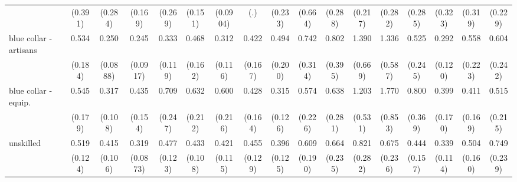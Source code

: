 {\begin{tabular}{l*{16}{c}}
                    &     (0.391)         &     (0.284)         &     (0.169)         &     (0.269)         &     (0.151)         &    (0.0904)         &         (.)         &     (0.233)         &     (0.664)         &     (0.288)         &     (0.217)         &     (0.282)         &     (0.285)         &     (0.323)         &     (0.319)         &     (0.229)         \\
[1em]
blue collar - artisans&       0.534         &       0.250\sym{***}&       0.245\sym{***}&       0.333\sym{**} &       0.468\sym{*}  &       0.312\sym{**} &       0.422\sym{*}  &       0.494         &       0.742         &       0.802         &       1.390         &       1.336         &       0.525         &       0.292\sym{**} &       0.558         &       0.604         \\
                    &     (0.184)         &    (0.0888)         &    (0.0917)         &     (0.119)         &     (0.162)         &     (0.116)         &     (0.167)         &     (0.200)         &     (0.314)         &     (0.395)         &     (0.669)         &     (0.587)         &     (0.245)         &     (0.120)         &     (0.223)         &     (0.242)         \\
[1em]
blue collar - equip.&       0.545         &       0.317\sym{***}&       0.435\sym{*}  &       0.709         &       0.632         &       0.600         &       0.428\sym{*}  &       0.315\sym{**} &       0.574         &       0.638         &       1.203         &       1.770         &       0.800         &       0.399\sym{*}  &       0.411\sym{*}  &       0.515         \\
                    &     (0.179)         &     (0.108)         &     (0.154)         &     (0.247)         &     (0.212)         &     (0.216)         &     (0.164)         &     (0.126)         &     (0.226)         &     (0.281)         &     (0.531)         &     (0.853)         &     (0.369)         &     (0.170)         &     (0.169)         &     (0.215)         \\
[1em]
unskilled           &       0.519\sym{**} &       0.415\sym{***}&       0.319\sym{***}&       0.477\sym{**} &       0.433\sym{***}&       0.421\sym{**} &       0.455\sym{**} &       0.396\sym{**} &       0.609         &       0.664         &       0.821         &       0.675         &       0.444\sym{*}  &       0.339\sym{**} &       0.504\sym{*}  &       0.749         \\
                    &     (0.124)         &     (0.106)         &    (0.0873)         &     (0.123)         &     (0.108)         &     (0.115)         &     (0.129)         &     (0.125)         &     (0.190)         &     (0.235)         &     (0.282)         &     (0.236)         &     (0.157)         &     (0.114)         &     (0.160)         &     (0.239)         \\

\end{tabular}}
